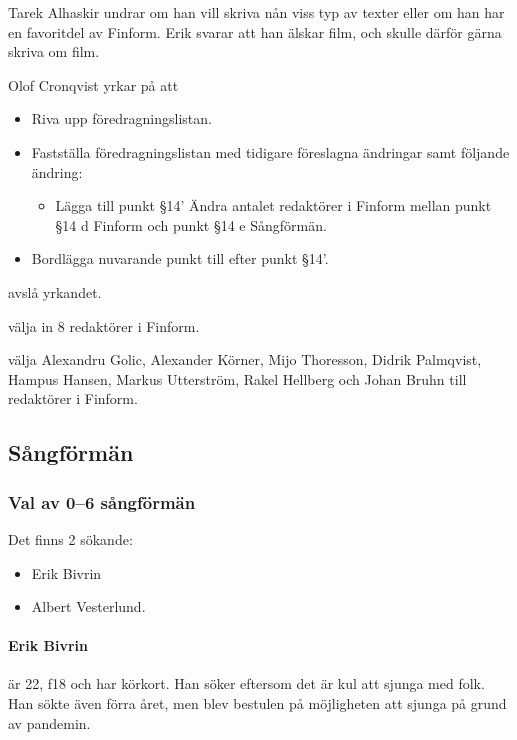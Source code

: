 \documentclass[hidelinks]{sektionsmote}
\begin{document}
Tarek Alhaskir undrar om han vill skriva nån viss typ av texter eller om han har en favoritdel av Finform.
Erik svarar att han älskar film, och skulle därför gärna skriva om film.

\begin{ofraga}
  Olof Cronqvist yrkar på att
  \begin{itemize}
    \item Riva upp föredragningslistan.
    \item Fastställa föredragningslistan med tidigare föreslagna ändringar samt följande ändring:
    \begin{itemize}
      \item Lägga till punkt §14' Ändra antalet redaktörer i Finform mellan punkt §14 d Finform och punkt §14 e Sångförmän.
    \end{itemize}
    \item Bordlägga nuvarande punkt till efter punkt §14'.
  \end{itemize}
  \begin{beslut}
    \item avslå yrkandet.
  \end{beslut}
\end{ofraga}

\begin{beslut}
  \item välja in 8 redaktörer i Finform.
  \item välja Alexandru Golic, Alexander Körner, Mijo Thoresson, Didrik Palmqvist, Hampus Hansen, Markus Utterström, Rakel Hellberg och Johan Bruhn till redaktörer i Finform.
\end{beslut}


\subsection{Sångförmän}
\subsubsection{Val av 0--6 sångförmän}
Det finns 2 sökande:
\begin{itemize}
    \item Erik Bivrin
    \item Albert Vesterlund.
\end{itemize}

\paragraph{Erik Bivrin} är 22, f18 och har körkort.
Han söker eftersom det är kul att sjunga med folk.
Han sökte även förra året, men blev bestulen på möjligheten att sjunga på grund av pandemin.
\end{document}
